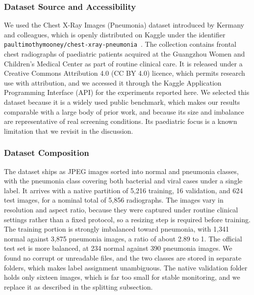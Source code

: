 \documentclass[preprint,12pt]{elsarticle}
\begin{document}
\subsubsection{Dataset Source and Accessibility}
We used the Chest X-Ray Images (Pneumonia) dataset introduced by Kermany and colleagues, which is openly distributed on Kaggle under the identifier \texttt{paultimothymooney/chest-xray-pneumonia}~\cite{kermany2018identifying}.
The collection contains frontal chest radiographs of paediatric patients acquired at the Guangzhou Women and Children's Medical Center as part of routine clinical care.
It is released under a Creative Commons Attribution 4.0 (CC BY 4.0) licence, which permits research use with attribution, and we accessed it through the Kaggle Application Programming Interface (API) for the experiments reported here.
We selected this dataset because it is a widely used public benchmark, which makes our results comparable with a large body of prior work, and because its size and imbalance are representative of real screening conditions.
Its paediatric focus is a known limitation that we revisit in the discussion.

\subsubsection{Dataset Composition}
The dataset ships as JPEG images sorted into normal and pneumonia classes, with the pneumonia class covering both bacterial and viral cases under a single label.
It arrives with a native partition of 5{,}216 training, 16 validation, and 624 test images, for a nominal total of 5{,}856 radiographs.
The images vary in resolution and aspect ratio, because they were captured under routine clinical settings rather than a fixed protocol, so a resizing step is required before training.
The training portion is strongly imbalanced toward pneumonia, with 1{,}341 normal against 3{,}875 pneumonia images, a ratio of about 2.89 to 1.
The official test set is more balanced, at 234 normal against 390 pneumonia images.
We found no corrupt or unreadable files, and the two classes are stored in separate folders, which makes label assignment unambiguous.
The native validation folder holds only sixteen images, which is far too small for stable monitoring, and we replace it as described in the splitting subsection.
\end{document}
